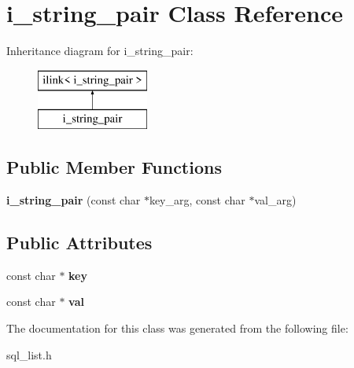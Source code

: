 \hypertarget{classi__string__pair}{}\section{i\+\_\+string\+\_\+pair Class Reference}
\label{classi__string__pair}
Inheritance diagram for i\+\_\+string\+\_\+pair\+:\begin{figure}[H]
\begin{center}
\leavevmode
\includegraphics[height=2.000000cm]{classi__string__pair}
\end{center}
\end{figure}
\subsection*{Public Member Functions}
\begin{DoxyCompactItemize}
\item 
\mbox{\label{classi__string__pair_a2b10a29a266f72b19ff83ca5015c6d67}} 
{\bfseries i\+\_\+string\+\_\+pair} (const char $\ast$key\+\_\+arg, const char $\ast$val\+\_\+arg)
\end{DoxyCompactItemize}
\subsection*{Public Attributes}
\begin{DoxyCompactItemize}
\item 
\mbox{\label{classi__string__pair_a9b03d8a698240cf29783e879b8229ebf}} 
const char $\ast$ {\bfseries key}
\item 
\mbox{\label{classi__string__pair_a0ec3eeaa39f3d7edd4587dd8accb7821}} 
const char $\ast$ {\bfseries val}
\end{DoxyCompactItemize}


The documentation for this class was generated from the following file\+:\begin{DoxyCompactItemize}
\item 
sql\+\_\+list.\+h\end{DoxyCompactItemize}
